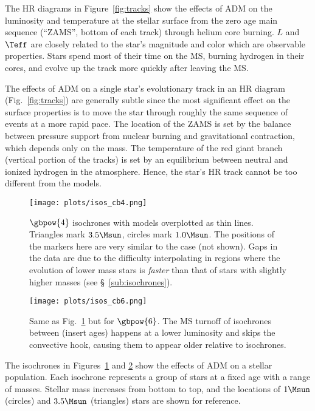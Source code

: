 The HR diagrams in Figure~\ref{fig:tracks} show the effects of ADM on the luminosity and temperature at the stellar surface from the zero age main sequence (“ZAMS”, bottom of each track) through helium core burning. $L$ and $\Teff$ are closely related to the star's magnitude and color which are observable properties. Stars spend most of their time on the MS, burning hydrogen in their cores, and evolve up the track more quickly after leaving the MS.

The effects of ADM on a single star's evolutionary track in an HR diagram (Fig.~\ref{fig:tracks}) are generally subtle since the most significant effect on the surface properties is to move the star through roughly the same sequence of events at a more rapid pace. The location of the ZAMS is set by the balance between pressure support from nuclear burning and gravitational contraction, which depends only on the mass. The temperature of the red giant branch (vertical portion of the tracks) is set by an equilibrium between neutral and ionized hydrogen in the atmosphere. Hence, the star's HR track cannot be too different from the \nodm models.


\begin{figure*}
  \centering
  \texttt{[image: plots/isos\_cb4.png]}
  \caption{$\gbpow{4}$ isochrones with \nodm models overplotted as thin lines. Triangles mark $3.5 \Msun$, circles mark $1.0 \Msun$. The positions of the markers here are very similar to the \nodm case (not shown). Gaps in the data are due to the difficulty interpolating in regions where the evolution of lower mass stars is \textit{faster} than that of stars with slightly higher masses (see \S~\ref{sub:isochrones}).
  }
  \label{fig:isos_cb4}
\end{figure*}

\begin{figure*}
  \centering
  \texttt{[image: plots/isos\_cb6.png]}
  \caption{Same as Fig.~\ref{fig:isos_cb4} but for $\gbpow{6}$. The MS turnoff of isochrones between (insert ages) happens at a lower luminosity and skips the convective hook, causing them to appear older relative to \nodm isochrones.
  }
  \label{fig:isos_cb6}
\end{figure*}


The isochrones in Figures~\ref{fig:isos_cb4} and \ref{fig:isos_cb6} show the effects of ADM on a stellar population. Each isochrone represents a group of stars at a fixed age with a range of masses. Stellar mass increases from bottom to top, and the locations of $1 \Msun$ (circles) and $3.5 \Msun$ (triangles) stars are shown for reference.

